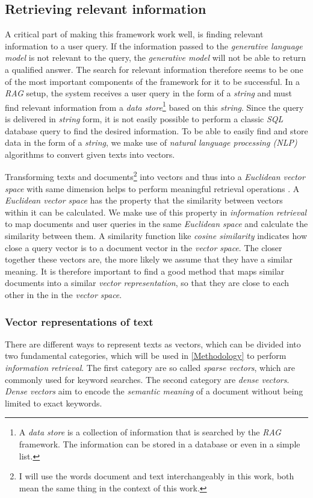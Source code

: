 \documentclass{article}
\begin{document}
\subsection{Retrieving relevant information}
A critical part of making this framework work well, is finding relevant information to a user query. If the information passed to the \textit{generative language model} is not relevant to the query, the \textit{generative model} will not be able to return a qualified answer. The search for relevant information therefore seems to be one of the most important components of the framework for it to be successful. In a \textit{RAG} setup, the system receives a user query in the form of a \textit{string} and must find relevant information from a \textit{data store}\footnote{A \textit{data store} is a collection of information that is searched by the \textit{RAG} framework. The information can be stored in a database or even in a simple list.
} based on this \textit{string}. Since the query is delivered in \textit{string} form, it is not easily possible to perform a classic \textit{SQL} database query to find the desired information. To be able to easily find and store data in the form of a \textit{string}, we make use of \textit{natural language processing (NLP)} algorithms to convert given texts into vectors.

Transforming texts and documents\footnote{I will use the words document and text interchangeably in this work, both mean the same thing in the context of this work.} into vectors and thus into a \textit{Euclidean vector space} with same dimension helps to perform meaningful retrieval operations \cite{vectorSpaceModel}. A \textit{Euclidean vector space} has the property that the similarity between vectors within it can be calculated. We make use of this property in \textit{information retrieval} to map documents and user queries in the same \textit{Euclidean space} and calculate the similarity between them. A similarity function like \textit{cosine similarity} indicates how close a query vector is to a document vector in the \textit{vector space}. The closer together these vectors are, the more likely we assume that they have a similar meaning. It is therefore important to find a good method that maps similar documents into a similar \textit{vector representation}, so that they are close to each other in the in the \textit{vector space}.

\subsubsection{Vector representations of text} \label{text2vector}
There are different ways to represent texts as vectors, which can be divided into two fundamental categories, which will be used in \cref{Methodology} to perform \textit{information retrieval}. The first category are so called \textit{sparse vectors}, which are commonly used for keyword searches. The second category are \textit{dense vectors}. \textit{Dense vectors} aim to encode the \textit{semantic meaning} of a document without being limited to exact keywords.
\\
\end{document}

